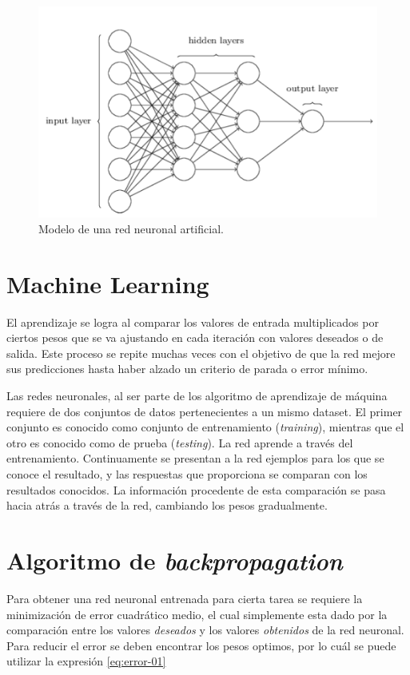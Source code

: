 \documentclass[a4paper,12pt,twocolumn]{article}
\begin{document}
  \begin{figure}[ht!]
    \centering
    \includegraphics[width=0.6\linewidth]{red-neuronal}
    \caption{Modelo de una red neuronal artificial.}
    \label{fig:red-neuronal}
  \end{figure}

  \section{Machine Learning}

  El aprendizaje se logra al comparar los valores de entrada multiplicados por
  ciertos pesos que se va ajustando en cada iteración con valores deseados o de
  salida. Este proceso se repite muchas veces con el objetivo de que la red
  mejore sus predicciones hasta haber alzado un criterio de parada o error
  mínimo.

  Las redes neuronales, al ser parte de los algoritmo de aprendizaje de máquina
  requiere de dos conjuntos de datos pertenecientes a un mismo dataset. El
  primer conjunto es conocido como conjunto de entrenamiento (\textit{training}),
  mientras que el otro es conocido como de prueba (\textit{testing}). La red
  aprende a través del entrenamiento. Continuamente se presentan a la red
  ejemplos para los que se conoce el resultado, y las respuestas que proporciona
  se comparan con los resultados conocidos. La información procedente de esta
  comparación se pasa hacia atrás a través de la red, cambiando los pesos
  gradualmente.

  \section{Algoritmo de \textit{backpropagation}}

  Para obtener una red neuronal entrenada para cierta tarea se requiere la
  minimización de error cuadrático medio, el cual simplemente esta dado por la
  comparación entre los valores \textit{deseados} y los valores
  \textit{obtenidos} de la red neuronal. Para reducir el error se deben
  encontrar los pesos optimos, por lo cuál se puede utilizar la expresión
  \ref{eq:error-01}
\end{document}
